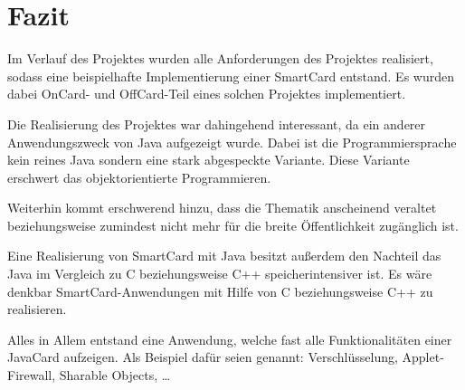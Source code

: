 \section{Fazit}
Im Verlauf des Projektes wurden alle Anforderungen des Projektes  realisiert, sodass eine beispielhafte Implementierung einer SmartCard entstand.
Es wurden dabei OnCard- und OffCard-Teil eines solchen Projektes implementiert.

Die Realisierung des Projektes war dahingehend interessant, da ein anderer Anwendungszweck von Java aufgezeigt wurde.
Dabei ist die Programmiersprache kein reines Java sondern eine stark abgespeckte Variante.
Diese Variante erschwert das objektorientierte Programmieren.

Weiterhin kommt erschwerend hinzu, dass die Thematik  anscheinend veraltet beziehungsweise zumindest nicht mehr für die breite Öffentlichkeit zugänglich ist.

Eine Realisierung von SmartCard mit Java besitzt außerdem den Nachteil das Java im Vergleich zu C beziehungsweise C++ speicherintensiver ist.
Es wäre denkbar SmartCard-Anwendungen mit Hilfe von C beziehungsweise C++ zu realisieren.

Alles in Allem entstand eine Anwendung, welche fast alle Funktionalitäten einer JavaCard aufzeigen.
Als Beispiel dafür seien genannt: Verschlüsselung, Applet-Firewall, Sharable Objects, \dots


